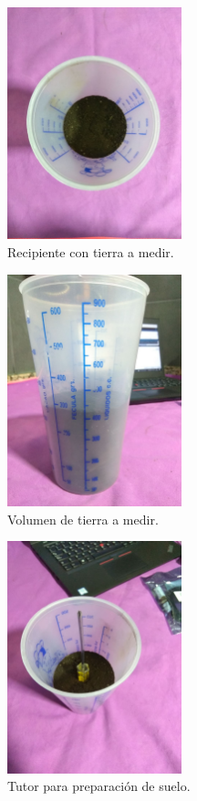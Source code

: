 \begin{figure}[H]
    \centering
    \includegraphics[width=0.45\textwidth]{imagenes/imagenes calibracion/vasolleno.jpg}
    \caption{Recipiente con tierra a medir.}
    \label{fig:vaso_lleno}
\end{figure}

\begin{figure}[H]
    \centering
    \includegraphics[width=0.45\textwidth]{imagenes/imagenes calibracion/medidavaso.jpg}
    \caption{Volumen de tierra a medir.}
    \label{fig:volumen}
\end{figure}

\begin{figure}[H]
    \centering
    \includegraphics[width=0.45\textwidth]{imagenes/imagenes calibracion/tutor.jpg}
    \caption{Tutor para preparación de suelo.}
    \label{fig:tutor}
\end{figure}

